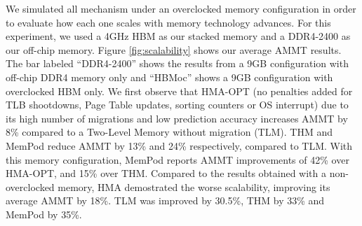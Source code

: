 We simulated all mechanism under an overclocked memory configuration in order to evaluate how each one scales with memory technology advances. For this experiment, we used a 4GHz HBM as our stacked memory and a DDR4-2400 as our off-chip memory. Figure \ref{fig:scalability} shows our average AMMT results. The bar labeled ``DDR4-2400'' shows the results from a 9GB configuration with off-chip DDR4 memory only and ``HBMoc'' shows a 9GB configuration with overclocked HBM only. We first observe that HMA-OPT (no penalties added for TLB shootdowns, Page Table updates, sorting counters or OS interrupt) due to its high number of migrations and low prediction accuracy increases AMMT by 8\% compared to a Two-Level Memory without migration (TLM). THM and MemPod reduce AMMT by 13\% and 24\% respectively, compared to TLM. With this memory configuration, MemPod reports AMMT improvements of 42\% over HMA-OPT, and 15\% over THM. Compared to the results obtained with a non-overclocked memory, HMA demostrated the worse scalability, improving its average AMMT by 18\%. TLM was improved by 30.5\%, THM by 33\% and MemPod by 35\%.
